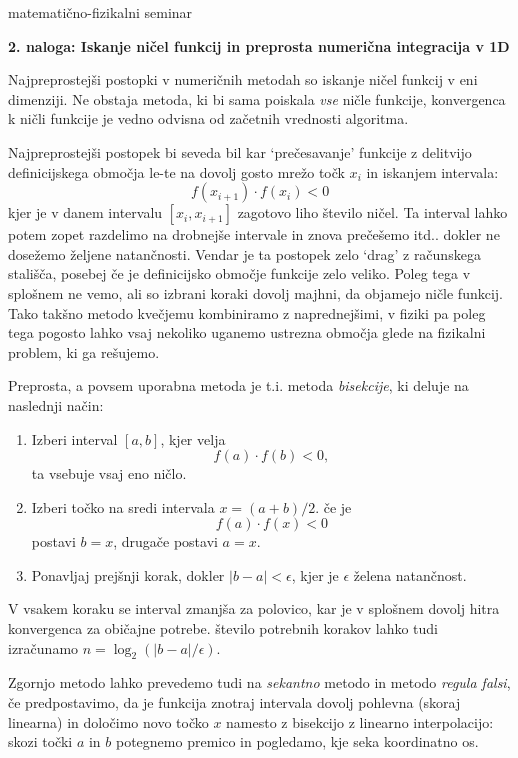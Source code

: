 \documentclass[12pt]{article}
\begin{document}
\thispagestyle{empty}



\setcounter{equation}{0}
\centerline{\sc matematično-fizikalni seminar~\thisyear}
\bigskip
\centerline{\bf 2. naloga: Iskanje ničel funkcij in preprosta
  numerična integracija v 1D }
\bigskip
\bigskip

Najpreprostejši postopki v numeričnih metodah so iskanje ničel funkcij v eni dimenziji.  Ne obstaja metoda, ki bi sama poiskala
\emph{vse} ničle funkcije, konvergenca k ničli funkcije je vedno
odvisna od začetnih vrednosti algoritma.

Najpreprostejši postopek bi seveda bil kar `prečesavanje'
funkcije z delitvijo definicijskega območja le-te na dovolj gosto
mrežo točk $x_i$ in iskanjem intervala:
$$ f(x_{i+1})\cdot f(x_i) < 0 $$
kjer je v danem  intervalu $[x_i, x_{i+1}]$ zagotovo liho število
ničel. Ta interval lahko potem zopet razdelimo na drobnejše
intervale in znova prečešemo itd.. dokler ne dosežemo željene
natančnosti. Vendar je ta postopek zelo `drag' z računskega stališča, posebej če je definicijsko območje funkcije zelo
veliko. Poleg tega v splošnem ne vemo, ali so izbrani koraki dovolj
majhni, da objamejo ničle funkcij. Tako takšno metodo kvečjemu kombiniramo z
naprednejšimi, v fiziki pa poleg tega pogosto
lahko vsaj nekoliko uganemo ustrezna območja glede na fizikalni
problem, ki ga rešujemo.

Preprosta, a povsem uporabna metoda je t.i. metoda \emph{bisekcije},
ki deluje na naslednji način:
\begin{enumerate}
\item Izberi interval $[a,b]$, kjer velja $$ f(a)\cdot f(b) < 0 , $$ ta
  vsebuje vsaj eno ničlo.
\item Izberi točko na sredi intervala $x=(a+b)/2$. če je $$
  f(a)\cdot f(x) < 0 $$ postavi $b = x$, drugače postavi $a =
  x$.
\item Ponavljaj prejšnji korak, dokler $|b-a| < \epsilon$, kjer je
  $\epsilon$ želena natančnost.
\end{enumerate}

V vsakem koraku se interval zmanjša za polovico, kar je v splošnem
dovolj hitra konvergenca za običajne potrebe. število
potrebnih korakov lahko tudi izračunamo $ n = \log_2 (
|b-a|/\epsilon) $.


Zgornjo metodo lahko prevedemo tudi na \emph{sekantno} metodo in
metodo \emph{regula falsi}, če
predpostavimo, da je funkcija znotraj intervala dovolj pohlevna
(skoraj linearna) in določimo novo točko $x$ namesto z bisekcijo
z linearno interpolacijo: skozi točki $a$ in $b$ potegnemo premico
in pogledamo, kje seka koordinatno os.
\end{document}

